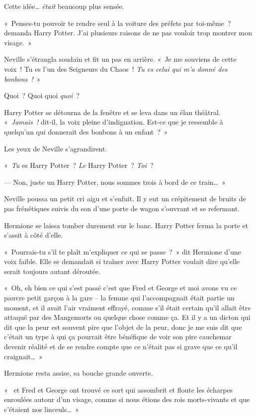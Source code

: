Cette idée… \emph{était} beaucoup plus sensée.

«~Penses-tu pouvoir te rendre seul à la voiture des préfets par toi-même~? demanda Harry Potter. J'ai plusieurs raisons de ne pas vouloir trop montrer mon visage.~»

Neville s'étrangla soudain et fit un pas en arrière. «~Je me souviens de cette voix~! Tu es l'un des Seigneurs du Chaos~! \emph{Tu es celui qui m'a donné des bonbons~!}~»

Quoi~? Quoi quoi \emph{quoi}~?

Harry Potter se détourna de la fenêtre et se leva dans un élan théâtral. «~\emph{Jamais~!} dit-il, la voix pleine d'indignation. Est-ce que je ressemble à quelqu'un qui donnerait des bonbons à un enfant~?~»

Les yeux de Neville s'agrandirent.

«~\emph{Tu} es Harry Potter~? \emph{Le} Harry Potter~? \emph{Toi}~?

--- Non, juste un Harry Potter, nous sommes trois à bord de ce train…~»

Neville poussa un petit cri aigu et s'enfuit. Il y eut un crépitement de bruits de pas frénétiques suivis du son d'une porte de wagon s'ouvrant et se refermant.

Hermione se laissa tomber durement sur le banc. Harry Potter ferma la porte et s'assit à côté d'elle.

«~Pourrais-tu s'il te plaît m'expliquer ce qui se passe~?~» dit Hermione d'une voix faible. Elle se demandait si traîner avec Harry Potter voulait dire qu'elle serait toujours autant déroutée.

«~Oh, eh bien ce qui s'est passé c'est que Fred et George et moi avons vu ce pauvre petit garçon à la gare -- la femme qui l'accompagnait était partie un moment, et il avait l'air vraiment effrayé, comme s'il était certain qu'il allait être attaqué par des Mangemorts ou quelque chose comme ça. Et il y a un dicton qui dit que la peur est souvent pire que l'objet de la peur, donc je me suis dit que c'était un type à qui ça pourrait être bénéfique de voir son pire cauchemar devenir réalité et de se rendre compte que ce n'était pas si grave que ce qu'il craignait…~»

Hermione resta assise, sa bouche grande ouverte.

«~ et Fred et George ont trouvé ce sort qui assombrit et floute les écharpes enroulées autour d'un visage, comme si nous étions des rois morts-vivants et que c'étaient nos linceuls…~»


